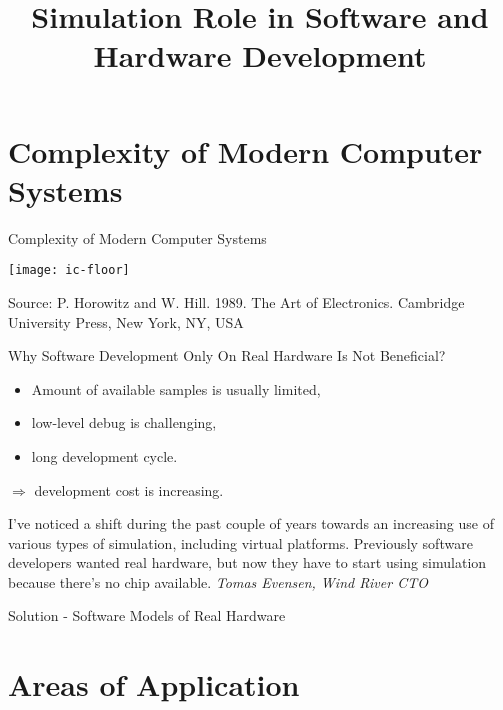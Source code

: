 

\title{Simulation Role in Software and Hardware Development}



\startslides

\section{Complexity of Modern Computer Systems}

\begin{frame}{Complexity of Modern Computer Systems}

\centering
\texttt{[image: ic-floor]}

\tiny{Source: P. Horowitz and W. Hill. 1989. The Art of Electronics. Cambridge
University Press, New York, NY, USA}

\end{frame}

\begin{frame}{Why Software Development Only On Real Hardware Is Not Beneficial?}

\begin{itemize}
\item Amount of available samples is usually limited,
\item low-level debug is challenging,
\item long development cycle.
\end{itemize}

$\Rightarrow$ development cost is increasing.

\bigskip

\tiny{I've noticed a shift during the past couple of years towards an increasing
use of various types of simulation, including virtual platforms. Previously
software developers wanted real hardware, but now they have to start using
simulation because there's no chip available.
\textit{Tomas Evensen, Wind River CTO}}

\end{frame}

\begin{frame}{Solution - Software Models of Real Hardware}
\centering 
{}

\end{frame}

\section{Areas of Application}

